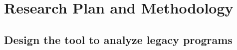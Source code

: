 \section{Research Plan and Methodology}
\subsection{Design the tool to analyze legacy programs}

\subsection{}